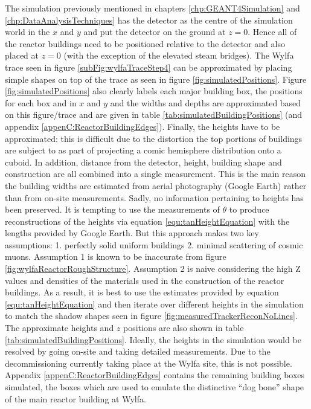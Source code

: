 The simulation previously mentioned in chapters \ref{chp:GEANT4Simulation} and \ref{chp:DataAnalysisTechniques} has the detector as the centre of the simulation world in the $x$ and $y$ and put the detector on the ground at  $z = 0 $. Hence all of the reactor buildings need to be positioned relative to the detector and also placed at $z = 0$ (with the exception of the elevated steam bridges). The Wylfa trace seen in figure \ref{subFig:wylfaTraceStep4} can be approximated by placing simple shapes on top of the trace as seen in figure \ref{fig:simulatedPositions}. Figure \ref{fig:simulatedPositions} also clearly labels each major building box, the positions for each box and in $x$ and $y$ and the widths and depths are approximated based on this figure/trace and are given in table \ref{tab:simulatedBuildingPositions} (and appendix \ref{appenC:ReactorBuildingEdges}). Finally, the heights have to be approximated: this is difficult due to the distortion the top portions of buildings are subject to as part of projecting a comic hemisphere distribution onto a cuboid. In addition, distance from the detector, height, building shape and construction are all combined into a single measurement. This is the main reason the building widths are estimated from aerial photography (Google Earth) rather than from on-site measurements. Sadly, no information pertaining to heights has been preserved. It is tempting to use the measurements of $\theta$ to produce reconstructions of the heights via equation \ref{equ:tanHeightEquation} with the lengths provided by Google Earth. But this approach makes two key assumptions: 1. perfectly solid uniform buildings 2. minimal scattering of cosmic muons. Assumption 1 is known to be inaccurate from figure \ref{fig:wylfaReactorRoughStructure}. Assumption 2 is naive considering the high Z values and densities of the materials used in the construction of the reactor buildings. As a result, it is best to use the estimates provided by equation \ref{equ:tanHeightEquation} and then iterate over different heights in the simulation to match the shadow shapes seen in figure \ref{fig:measuredTrackerReconNoLines}. The approximate heights and $z$ positions are also shown in table \ref{tab:simulatedBuildingPositions}. Ideally, the heights in the simulation would be resolved by going on-site and taking detailed measurements. Due to the decommissioning currently taking place at the Wylfa site, this is not possible. Appendix \ref{appenC:ReactorBuildingEdges} contains the remaining building boxes simulated, the boxes which are used to emulate the distinctive ``dog bone'' shape of the main reactor building at Wylfa.

